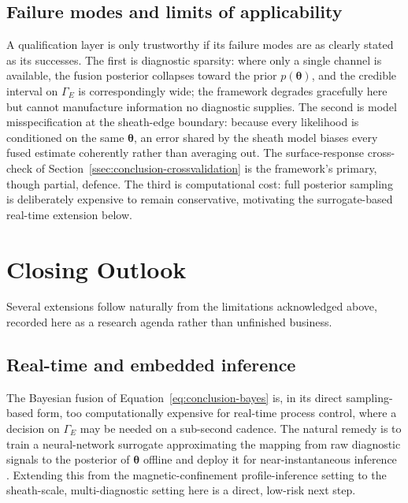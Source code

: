 \subsection{Failure modes and limits of applicability}
\label{ssec:conclusion-limits}

A qualification layer is only trustworthy if its failure modes are as clearly stated as its successes. The first is diagnostic sparsity: where only a single channel is available, the fusion posterior collapses toward the prior $p(\boldsymbol{\theta})$, and the credible interval on $\Gamma_{E}$ is correspondingly wide; the framework degrades gracefully here but cannot manufacture information no diagnostic supplies. The second is model misspecification at the sheath-edge boundary: because every likelihood is conditioned on the same $\boldsymbol{\theta}$, an error shared by the sheath model biases every fused estimate coherently rather than averaging out. The surface-response cross-check of Section~\ref{ssec:conclusion-crossvalidation} is the framework's primary, though partial, defence. The third is computational cost: full posterior sampling is deliberately expensive to remain conservative, motivating the surrogate-based real-time extension below.

\section{Closing Outlook}
\label{sec:conclusion-outlook}

Several extensions follow naturally from the limitations acknowledged above, recorded here as a research agenda rather than unfinished business.

\subsection{Real-time and embedded inference}
\label{ssec:conclusion-realtime}

The Bayesian fusion of Equation~\eqref{eq:conclusion-bayes} is, in its direct sampling-based form, too computationally expensive for real-time process control, where a decision on $\Gamma_{E}$ may be needed on a sub-second cadence. The natural remedy is to train a neural-network surrogate approximating the mapping from raw diagnostic signals to the posterior of $\boldsymbol{\theta}$ offline and deploy it for near-instantaneous inference \cite{ref0728,ref0731}. Extending this from the magnetic-confinement profile-inference setting to the sheath-scale, multi-diagnostic setting here is a direct, low-risk next step.

